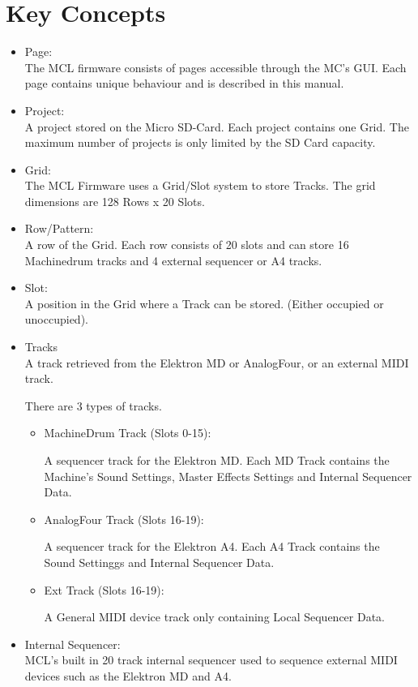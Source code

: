 \chapter{Key Concepts}

\begin{itemize}
\item Page:
\\
The MCL firmware consists of pages accessible through the MC's GUI. Each page contains unique behaviour and is described in this manual.
\item Project:
\\
A project stored on the Micro SD-Card. Each project contains one Grid. 
The maximum number of projects is only limited by the SD Card capacity.

\item Grid:
\\
The MCL Firmware uses a Grid/Slot system to store Tracks. 
The grid dimensions are 128 Rows x 20 Slots. 

\item Row/Pattern:
\\
A row of the Grid. Each row consists of 20 slots and can store 16 Machinedrum tracks and 4 external sequencer or A4 tracks. 

\item Slot:
\\
A position in the Grid where a Track can be stored. (Either occupied or unoccupied).

\item Tracks
\\
A track retrieved from the Elektron MD or AnalogFour, or an external MIDI track.

There are 3 types of tracks.
\begin{itemize}

\item MachineDrum Track (Slots 0-15):

A sequencer track for the Elektron MD. Each MD Track contains the Machine's Sound Settings, Master Effects Settings and Internal Sequencer Data.

\item AnalogFour Track (Slots 16-19):

A sequencer track for the Elektron A4. Each A4 Track contains the  Sound Settinggs and Internal Sequencer Data.
\item Ext Track (Slots 16-19):

A General MIDI device track only containing Local Sequencer Data.
\end{itemize}

\item Internal Sequencer:\\
MCL's built in 20 track internal sequencer used to sequence external MIDI devices such as the Elektron MD and A4.

\end{itemize}


